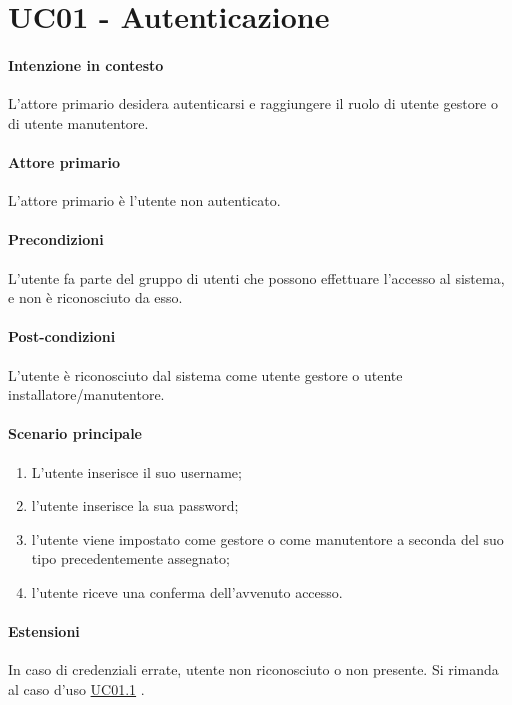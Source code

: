 \section{UC01 - Autenticazione}\label{uc:01}

\paragraph{Intenzione in contesto} L'attore primario desidera autenticarsi e raggiungere il ruolo di utente gestore o di utente manutentore.

\paragraph{Attore primario} L'attore primario è l'utente non autenticato.

\paragraph{Precondizioni} L'utente fa parte del gruppo di utenti che possono effettuare l'accesso al sistema, e non è riconosciuto da esso.

\paragraph{Post-condizioni} L'utente è riconosciuto dal sistema come utente gestore o utente installatore/manutentore.

\paragraph{Scenario principale}
\begin{enumerate}
    \item L'utente inserisce il suo username;
    \item l'utente inserisce la sua password;
    \item l'utente viene impostato come gestore o come manutentore a seconda del suo tipo precedentemente assegnato; 
    \item l'utente riceve una conferma dell'avvenuto accesso.
\end{enumerate}


\paragraph{Estensioni} In caso di credenziali errate, utente non riconosciuto o non presente. Si rimanda al caso d'uso \hyperref[uc:01.1]{UC01.1} .


